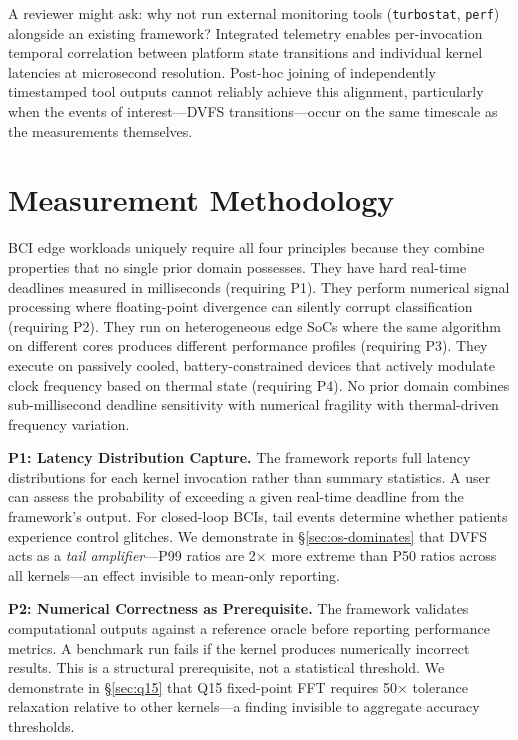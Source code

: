 \documentclass[sigplan,10pt]{acmart}
\begin{document}
A reviewer might ask: why not run external monitoring tools (\texttt{turbostat}, \texttt{perf}) alongside an existing framework? Integrated telemetry enables per-invocation temporal correlation between platform state transitions and individual kernel latencies at microsecond resolution. Post-hoc joining of independently timestamped tool outputs cannot reliably achieve this alignment, particularly when the events of interest---DVFS transitions---occur on the same timescale as the measurements themselves.


\section{Measurement Methodology}
\label{sec:methodology}

BCI edge workloads uniquely require all four principles because they combine properties that no single prior domain possesses. They have hard real-time deadlines measured in milliseconds (requiring P1). They perform numerical signal processing where floating-point divergence can silently corrupt classification (requiring P2). They run on heterogeneous edge SoCs where the same algorithm on different cores produces different performance profiles (requiring P3). They execute on passively cooled, battery-constrained devices that actively modulate clock frequency based on thermal state (requiring P4). No prior domain combines sub-millisecond deadline sensitivity with numerical fragility with thermal-driven frequency variation.

\textbf{P1: Latency Distribution Capture.}
The framework reports full latency distributions for each kernel invocation rather than summary statistics. A user can assess the probability of exceeding a given real-time deadline from the framework's output. For closed-loop BCIs, tail events determine whether patients experience control glitches. We demonstrate in \S\ref{sec:os-dominates} that DVFS acts as a \emph{tail amplifier}---P99 ratios are 2$\times$ more extreme than P50 ratios across all kernels---an effect invisible to mean-only reporting.

\textbf{P2: Numerical Correctness as Prerequisite.}
The framework validates computational outputs against a reference oracle before reporting performance metrics. A benchmark run fails if the kernel produces numerically incorrect results. This is a structural prerequisite, not a statistical threshold. We demonstrate in \S\ref{sec:q15} that Q15 fixed-point FFT requires 50$\times$ tolerance relaxation relative to other kernels---a finding invisible to aggregate accuracy thresholds.
\end{document}
